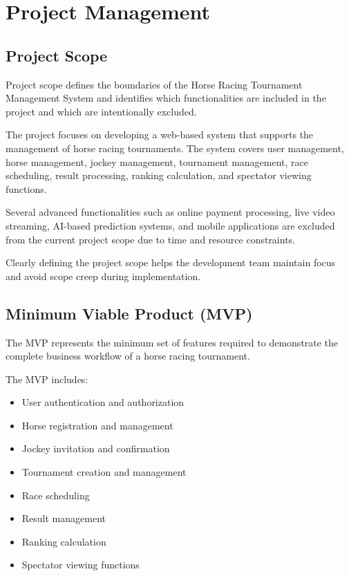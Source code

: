 \chapter{Project Management}
\label{chap:project_management}

\section{Project Scope}

Project scope defines the boundaries of the Horse Racing Tournament Management System and identifies which functionalities are included in the project and which are intentionally excluded.

The project focuses on developing a web-based system that supports the management of horse racing tournaments. The system covers user management, horse management, jockey management, tournament management, race scheduling, result processing, ranking calculation, and spectator viewing functions.

Several advanced functionalities such as online payment processing, live video streaming, AI-based prediction systems, and mobile applications are excluded from the current project scope due to time and resource constraints.

Clearly defining the project scope helps the development team maintain focus and avoid scope creep during implementation.

\section{Minimum Viable Product (MVP)}

The MVP represents the minimum set of features required to demonstrate the complete business workflow of a horse racing tournament.

The MVP includes:

\begin{itemize}
	\item User authentication and authorization
	\item Horse registration and management
	\item Jockey invitation and confirmation
	\item Tournament creation and management
	\item Race scheduling
	\item Result management
	\item Ranking calculation
	\item Spectator viewing functions
\end{itemize}

